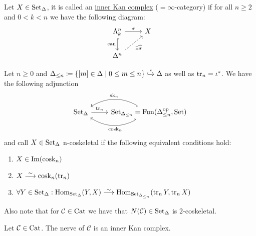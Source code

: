 \begin{defi}
    Let $X \in \operatorname{Set}_{\Delta}$, it is called an \underline{inner Kan complex} ($=\infty$-category) if for all $n\geq 2$ and $0 < k < n $ we have the following diagram:
    \[
    \begin{tikzcd}
        \Lambda_k^n
        \arrow[r, "\sigma"]
        \arrow[d, hook, "\can"']
        &
        X
        \\
        \Delta^n
        \arrow[ur, dashed, "\exists \widehat{\sigma}"']
    \end{tikzcd}
    \]
\end{defi}

\begin{rmk}
    Let $n \geq 0$ and 
    $\Delta_{\leq n} \coloneqq \{ [m] \in \Delta \mid 0 \leq m \leq n\}\xhookrightarrow{\iota} \Delta$ as well as $\operatorname{tr}_n = \iota^*$. 
    We have the following adjunction
    \[
    \begin{tikzcd}
        \SetD
        &
        \Set_{\Delta_{\leq n}}= \Fun(\Delta^{\op}_{\leq n} , \Set)
        \arrow[from=1-1, to=1-2, "\tru_n"]
        \arrow[from=1-2, to=1-1, bend left, hook', "\cosk_n" pos=0.45]
        \arrow[from=1-2, to=1-1, bend right, hook,"\sk_n"']
    \end{tikzcd}
    \]
    and call $X \in \operatorname{Set}_{\Delta}$ n-coskeletal if the following equivalent conditions hold:
    \begin{enumerate}
        \item 
        $X \in \operatorname{Im}(\operatorname{cosk}_n)$
        \item 
        $X \isomorphism \cosk_n(\tru_n)$
        \item 
        $\forall Y \in \SetD: \Hom_{\SetD}(Y,X) \isomorphism \Hom_{\Set_{\Delta_{\leq n}}}(\tru_n Y, \tru_n X)$
    \end{enumerate}
    Also note that for $\mathcal{C} \in \operatorname{Cat}$ we have that $N(\mathcal{C)} \in \operatorname{Set}_{\Delta}$ is 2-coskeletal.
\end{rmk}

\begin{prop}
    Let $\mathcal{C} \in \operatorname{Cat}$. The nerve of $\mathcal{C}$ is an inner Kan complex.
\end{prop}

